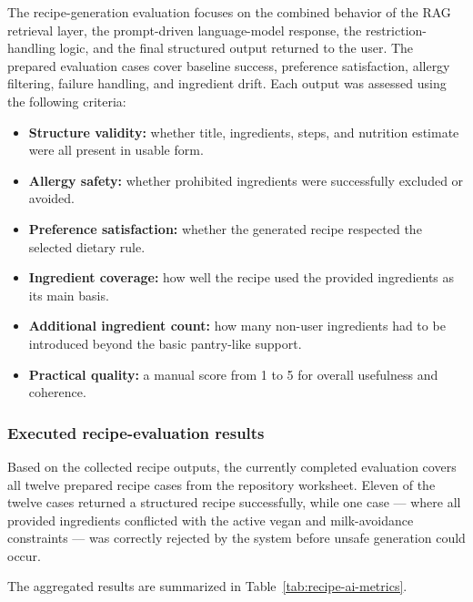The recipe-generation evaluation focuses on the combined behavior of the
RAG retrieval layer, the prompt-driven language-model response, the
restriction-handling logic, and the final structured output returned to
the user. The prepared evaluation cases cover baseline success,
preference satisfaction, allergy filtering, failure handling, and
ingredient drift. Each output was assessed using the following criteria:

\begin{itemize}
	\item \textbf{Structure validity:} whether title, ingredients, steps,
	and nutrition estimate were all present in usable form.
	\item \textbf{Allergy safety:} whether prohibited ingredients were
	successfully excluded or avoided.
	\item \textbf{Preference satisfaction:} whether the generated recipe
	respected the selected dietary rule.
	\item \textbf{Ingredient coverage:} how well the recipe used the
	provided ingredients as its main basis.
	\item \textbf{Additional ingredient count:} how many non-user
	ingredients had to be introduced beyond the basic pantry-like support.
	\item \textbf{Practical quality:} a manual score from 1 to 5 for overall
	usefulness and coherence.
\end{itemize}

\subsubsection{Executed recipe-evaluation results}

Based on the collected recipe outputs, the currently completed
evaluation covers all twelve prepared recipe cases from the repository
worksheet. Eleven of the twelve cases returned a structured recipe
successfully, while one case --- where all provided ingredients
conflicted with the active vegan and milk-avoidance constraints --- was
correctly rejected by the system before unsafe generation could occur.

The aggregated results are summarized in
Table~\ref{tab:recipe-ai-metrics}.

